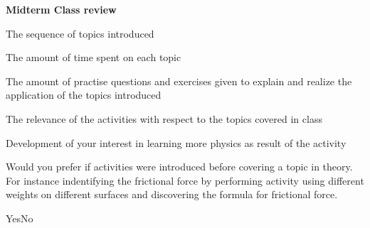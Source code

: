 \documentclass[12pt]{exam}
\begin{document}
\begin{center}
\textbf{Midterm Class review}
\end{center}
\vspace{0.1in}
\vspace{0.1in}
\begin{questions}
\question The sequence of topics introduced
\begin{oneparcheckboxes}
\end{oneparcheckboxes}
\question The amount of time spent on each topic  
\begin{oneparcheckboxes}
\end{oneparcheckboxes}
\question The amount of practise questions and exercises given to explain and realize the application of the topics introduced
\begin{oneparcheckboxes}
\end{oneparcheckboxes} 
\end{questions}
\begin{questions}
\question The relevance of the activities with respect to the topics covered in class
\begin{oneparcheckboxes}
\end{oneparcheckboxes}
\question Development of your interest in learning more physics as result of the activity
\begin{oneparcheckboxes}
\end{oneparcheckboxes}
\question Would you prefer if activities were introduced before covering a topic in theory.  For instance indentifying the frictional force by performing activity using different weights on different surfaces and discovering the formula for frictional force. 
\begin{oneparcheckboxes}
\choice Yes\choice No
\end{oneparcheckboxes}

\end{questions}
\fillwithlines{2in}

\end{document}
